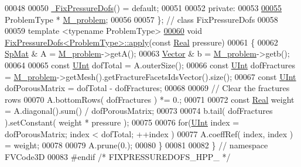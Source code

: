 \begin{DoxyCode}
00048 
00050     \hyperlink{classFVCode3D_1_1FixPressureDofs_af39545b363f6eb33c5cbffc2fe1d98c9}{~FixPressureDofs}() = \textcolor{keywordflow}{default};
00051 
00052 \textcolor{keyword}{private}:
00053 
\hypertarget{FixPressureDofs_8hpp_source.tex_l00055}{}\hyperlink{classFVCode3D_1_1FixPressureDofs_ab62654a9bac382fc13e5e3da2a77532b}{00055}     ProblemType * \hyperlink{classFVCode3D_1_1FixPressureDofs_ab62654a9bac382fc13e5e3da2a77532b}{M\_problem};
00056 
00057 \}; \textcolor{comment}{// class FixPressureDofs}
00058 
00059 \textcolor{keyword}{template} <\textcolor{keyword}{typename} ProblemType>
\hypertarget{FixPressureDofs_8hpp_source.tex_l00060}{}\hyperlink{classFVCode3D_1_1FixPressureDofs_a3393776b99ad339672ba99cfc5c200e2}{00060} \textcolor{keywordtype}{void} \hyperlink{classFVCode3D_1_1FixPressureDofs_a3393776b99ad339672ba99cfc5c200e2}{FixPressureDofs<ProblemType>::apply}(\textcolor{keyword}{const} 
      \hyperlink{namespaceFVCode3D_a40c1f5588a248569d80aa5f867080e83}{Real} pressure)
00061 \{
00062     \hyperlink{namespaceFVCode3D_ac1032289d96638cf0ad6c52ef639095f}{SpMat} & A = \hyperlink{classFVCode3D_1_1FixPressureDofs_ab62654a9bac382fc13e5e3da2a77532b}{M\_problem}->getA();
00063     \hyperlink{namespaceFVCode3D_a16ccf345652402bccd1a5d2e6782526c}{Vector} & b = \hyperlink{classFVCode3D_1_1FixPressureDofs_ab62654a9bac382fc13e5e3da2a77532b}{M\_problem}->getb();
00064 
00065     \textcolor{keyword}{const} \hyperlink{namespaceFVCode3D_a4bf7e328c75d0fd504050d040ebe9eda}{UInt} dofTotal = A.outerSize();
00066     \textcolor{keyword}{const} \hyperlink{namespaceFVCode3D_a4bf7e328c75d0fd504050d040ebe9eda}{UInt} dofFractures = \hyperlink{classFVCode3D_1_1FixPressureDofs_ab62654a9bac382fc13e5e3da2a77532b}{M\_problem}->getMesh().getFractureFacetsIdsVector().size();
00067     \textcolor{keyword}{const} \hyperlink{namespaceFVCode3D_a4bf7e328c75d0fd504050d040ebe9eda}{UInt} dofPorousMatrix = dofTotal - dofFractures;
00068 
00069     \textcolor{comment}{// Clear the fractures rows}
00070     A.bottomRows( dofFractures ) *= 0.;
00071 
00072     \textcolor{keyword}{const} \hyperlink{namespaceFVCode3D_a40c1f5588a248569d80aa5f867080e83}{Real} weight = A.diagonal().sum() / dofPorousMatrix;
00073 
00074     b.tail( dofFractures ).setConstant( weight * pressure );
00075 
00076     \textcolor{keywordflow}{for}(\hyperlink{namespaceFVCode3D_a4bf7e328c75d0fd504050d040ebe9eda}{UInt} index = dofPorousMatrix; index < dofTotal; ++index )
00077         A.coeffRef( index, index ) = weight;
00078 
00079     A.prune(0.);
00080 \}
00081 
00082 \} \textcolor{comment}{// namespace FVCode3D}
00083 \textcolor{preprocessor}{#endif }\textcolor{comment}{/* FIXPRESSUREDOFS\_HPP\_ */}\textcolor{preprocessor}{}
\end{DoxyCode}
